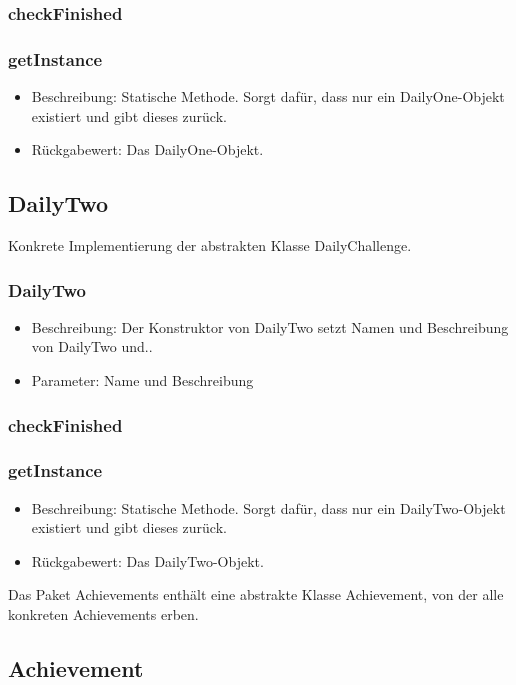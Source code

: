\documentclass[a4paper]{scrreprt}
\begin{document}
   \subsubsection{checkFinished}
   \subsubsection{getInstance}
   \begin{itemize}
   \item Beschreibung: Statische Methode. Sorgt dafür, dass nur ein DailyOne-Objekt existiert und gibt dieses zurück.
   \item Rückgabewert: Das DailyOne-Objekt.
   \end{itemize}
   
   \subsection{DailyTwo}
   Konkrete Implementierung der abstrakten Klasse DailyChallenge.
   \subsubsection{DailyTwo}
   \begin{itemize}
   	\item Beschreibung: Der Konstruktor von DailyTwo setzt Namen und Beschreibung von DailyTwo und..
   	\item Parameter: Name und Beschreibung 
   \end{itemize}
   \subsubsection{checkFinished}
   \subsubsection{getInstance}
   \begin{itemize}
   \item Beschreibung: Statische Methode. Sorgt dafür, dass nur ein DailyTwo-Objekt existiert und gibt dieses zurück.
   \item Rückgabewert: Das DailyTwo-Objekt.
\end{itemize}
   
   Das Paket Achievements enthält eine abstrakte Klasse Achievement, von der alle konkreten Achievements erben.
   
   \subsection{Achievement}
\end{document}
